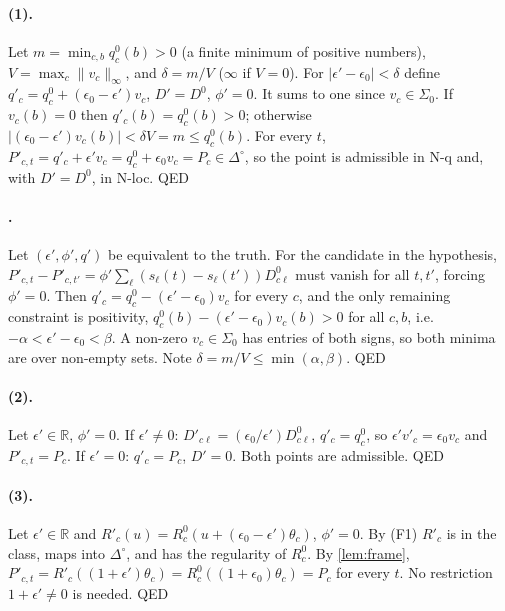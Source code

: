 \documentclass[10pt,twocolumn]{article}
\theoremstyle{definition}
\theoremstyle{remark}
\renewcommand{\qedsymbol}{{\normalfont\small QED}}
\newcommand{\R}{\mathbb{R}}
\newcommand{\eps}{\epsilon}
\newcommand{\simp}{\Delta^{\circ}}
\begin{document}
\paragraph{(1).} Let $m=\min_{c,b}q^0_c(b)>0$ (a finite minimum of positive numbers), $V=\max_c\|v_c\|_\infty$, and $\delta=m/V$ ($\infty$ if $V=0$). For $|\eps'-\eps_0|<\delta$ define $q'_c=q^0_c+(\eps_0-\eps')v_c$, $D'=D^0$, $\phi'=0$. It sums to one since $v_c\in\Sigma_0$. If $v_c(b)=0$ then $q'_c(b)=q^0_c(b)>0$; otherwise $|(\eps_0-\eps')v_c(b)|<\delta V=m\le q^0_c(b)$. For every $t$, $P'_{c,t}=q'_c+\eps'v_c=q^0_c+\eps_0v_c=P_c\in\simp$, so the point is admissible in N-q and, with $D'=D^0$, in N-loc. \hfill\qedsymbol

\paragraph{.} Let $(\eps',\phi',q')$ be equivalent to the truth. For the candidate in the hypothesis, $P'_{c,t}-P'_{c,t'}=\phi'\sum_\ell(s_\ell(t)-s_\ell(t'))D^0_{c\ell}$ must vanish for all $t,t'$, forcing $\phi'=0$. Then $q'_c=q^0_c-(\eps'-\eps_0)v_c$ for every $c$, and the only remaining constraint is positivity, $q^0_c(b)-(\eps'-\eps_0)v_c(b)>0$ for all $c,b$, i.e.\ $-\alpha<\eps'-\eps_0<\beta$. A non-zero $v_c\in\Sigma_0$ has entries of both signs, so both minima are over non-empty sets. Note $\delta=m/V\le\min(\alpha,\beta)$. \hfill\qedsymbol

\paragraph{(2).} Let $\eps'\in\R$, $\phi'=0$. If $\eps'\neq0$: $D'_{c\ell}=(\eps_0/\eps')D^0_{c\ell}$, $q'_c=q^0_c$, so $\eps'v'_c=\eps_0v_c$ and $P'_{c,t}=P_c$. If $\eps'=0$: $q'_c=P_c$, $D'=0$. Both points are admissible. \hfill\qedsymbol

\paragraph{(3).} Let $\eps'\in\R$ and $R'_c(u)=R^0_c(u+(\eps_0-\eps')\theta_c)$, $\phi'=0$. By (F1) $R'_c$ is in the class, maps into $\simp$, and has the regularity of $R^0_c$. By \cref{lem:frame}, $P'_{c,t}=R'_c((1+\eps')\theta_c)=R^0_c((1+\eps_0)\theta_c)=P_c$ for every $t$. No restriction $1+\eps'\neq0$ is needed. \hfill\qedsymbol
\end{document}
